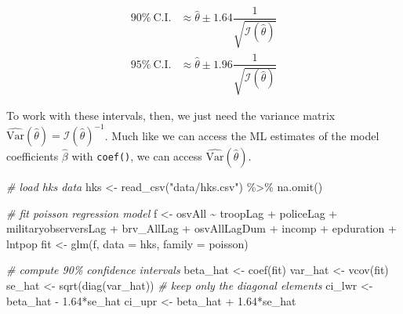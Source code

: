 \documentclass[
]{book}
\newenvironment{Shaded}{\begin{snugshade}}{\end{snugshade}}
\newcommand{\AttributeTok}[1]{\textcolor[rgb]{0.77,0.63,0.00}{#1}}
\newcommand{\CommentTok}[1]{\textcolor[rgb]{0.56,0.35,0.01}{\textit{#1}}}
\newcommand{\FloatTok}[1]{\textcolor[rgb]{0.00,0.00,0.81}{#1}}
\newcommand{\FunctionTok}[1]{\textcolor[rgb]{0.00,0.00,0.00}{#1}}
\newcommand{\NormalTok}[1]{#1}
\newcommand{\OtherTok}[1]{\textcolor[rgb]{0.56,0.35,0.01}{#1}}
\newcommand{\SpecialCharTok}[1]{\textcolor[rgb]{0.00,0.00,0.00}{#1}}
\newcommand{\StringTok}[1]{\textcolor[rgb]{0.31,0.60,0.02}{#1}}
\begin{document}
\[
\begin{align*}
 90\%~\text{C.I.}  &\approx \hat{\theta} \pm 1.64\dfrac{1}{\sqrt{\mathcal{I}(\hat{\theta})}}\\
 95\%~\text{C.I.}  &\approx \hat{\theta} \pm 1.96\dfrac{1}{\sqrt{\mathcal{I}(\hat{\theta})}}
\end{align*}
\]

To work with these intervals, then, we just need the variance matrix
\(\widehat{\text{Var}}(\hat{\theta}) = \mathcal{I}(\hat{\theta})^{-1}\).
Much like we can access the ML estimates of the model coefficients
\(\hat{\beta}\) with \texttt{coef()}, we can access
\(\widehat{\text{Var}}(\hat{\theta})\).

\begin{Shaded}
\begin{Highlighting}[]
\CommentTok{\# load hks data}
\NormalTok{hks }\OtherTok{\textless{}{-}} \FunctionTok{read\_csv}\NormalTok{(}\StringTok{"data/hks.csv"}\NormalTok{) }\SpecialCharTok{\%\textgreater{}\%}
  \FunctionTok{na.omit}\NormalTok{()}

\CommentTok{\# fit poisson regression model}
\NormalTok{f }\OtherTok{\textless{}{-}}\NormalTok{ osvAll }\SpecialCharTok{\textasciitilde{}}\NormalTok{ troopLag }\SpecialCharTok{+}\NormalTok{ policeLag }\SpecialCharTok{+}\NormalTok{ militaryobserversLag }\SpecialCharTok{+} 
\NormalTok{  brv\_AllLag }\SpecialCharTok{+}\NormalTok{ osvAllLagDum }\SpecialCharTok{+}\NormalTok{ incomp }\SpecialCharTok{+}\NormalTok{ epduration }\SpecialCharTok{+} 
\NormalTok{  lntpop}
\NormalTok{fit }\OtherTok{\textless{}{-}} \FunctionTok{glm}\NormalTok{(f, }\AttributeTok{data =}\NormalTok{ hks, }\AttributeTok{family =}\NormalTok{ poisson)}

\CommentTok{\# compute 90\% confidence intervals}
\NormalTok{beta\_hat }\OtherTok{\textless{}{-}} \FunctionTok{coef}\NormalTok{(fit)}
\NormalTok{var\_hat }\OtherTok{\textless{}{-}} \FunctionTok{vcov}\NormalTok{(fit)}
\NormalTok{se\_hat }\OtherTok{\textless{}{-}} \FunctionTok{sqrt}\NormalTok{(}\FunctionTok{diag}\NormalTok{(var\_hat))  }\CommentTok{\# keep only the diagonal elements}
\NormalTok{ci\_lwr }\OtherTok{\textless{}{-}}\NormalTok{ beta\_hat }\SpecialCharTok{{-}} \FloatTok{1.64}\SpecialCharTok{*}\NormalTok{se\_hat}
\NormalTok{ci\_upr }\OtherTok{\textless{}{-}}\NormalTok{ beta\_hat }\SpecialCharTok{+} \FloatTok{1.64}\SpecialCharTok{*}\NormalTok{se\_hat}


\end{Highlighting}
\end{Shaded}
\end{document}
